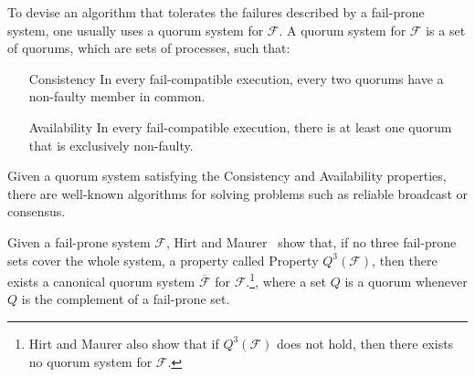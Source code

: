 \documentclass[11pt,letterpaper]{article}
\begin{document}
To devise an algorithm that tolerates the failures described by a fail-prone system, one usually uses a quorum system for $\mathcal{F}$.
A quorum system for $\mathcal{F}$ is a set of quorums, which are sets of processes, such that:%
\begin{itemize}
  \item[Consistency] In every fail-compatible execution, every two quorums have a non-faulty member in common.
  \item[Availability] In every fail-compatible execution, there is at least one quorum that is exclusively non-faulty.
\end{itemize}
Given a quorum system satisfying the Consistency and Availability properties, there are well-known algorithms for solving problems such as reliable broadcast or consensus.

Given a fail-prone system $\mathcal{F}$, Hirt and Maurer~\cite{hirtPlayerSimulationGeneral2000} show that, if no three fail-prone sets cover the whole system, a property called Property $Q^3(\mathcal{F})$, then there exists a canonical quorum system $\overline{\mathcal{F}}$ for $\mathcal{F}$.\footnote{Hirt and Maurer also show that if $Q^3(\mathcal{F})$ does not hold, then there exists no quorum system for $\mathcal{F}$.}, where a set $Q$ is a quorum whenever $Q$ is the complement of a fail-prone set.

\end{document}
